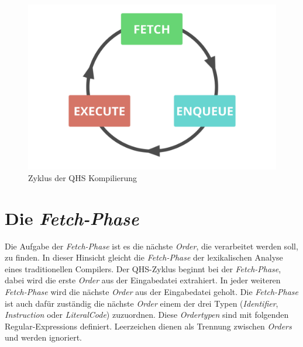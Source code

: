 \begin{figure}[h!]
    \centering
    \includegraphics[scale=0.75]{resources/images/qhs-cycle.png}
    \caption{Zyklus der QHS Kompilierung}
    \label{fig:qhs-cycle}
\end{figure}

\section{Die \textit{Fetch-Phase}} \label{sec:qhs-fetch}
Die Aufgabe der \textit{Fetch-Phase} ist es die nächste \textit{Order}, die verarbeitet werden soll, zu finden. In dieser Hinsicht gleicht die \textit{Fetch-Phase} der lexikalischen Analyse eines traditionellen Compilers.
Der QHS-Zyklus beginnt bei der \textit{Fetch-Phase}, dabei wird die erste \textit{Order} aus der Eingabedatei extrahiert. In jeder weiteren \textit{Fetch-Phase} wird die nächste \textit{Order} aus der Eingabedatei geholt.
Die \textit{Fetch-Phase} ist auch dafür zuständig die nächste \textit{Order} einem der drei Typen (\textit{Identifier}, \textit{Instruction} oder \textit{LiteralCode}) zuzuordnen.
Diese \textit{Ordertypen} sind mit folgenden Regular-Expressions definiert. Leerzeichen dienen als Trennung zwischen \textit{Orders} und werden ignoriert.

